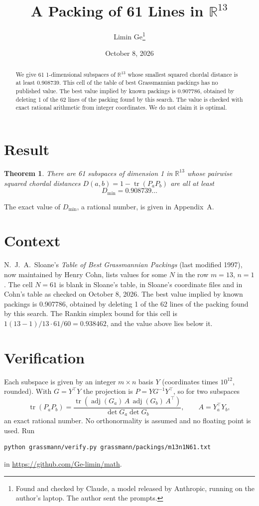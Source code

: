 \documentclass[11pt,a4paper]{article}
\title{A Packing of 61 Lines in $\mathbb{R}^{13}$}
\author{Limin Ge\thanks{Found and checked by Claude, a model released by Anthropic, running on the author's laptop. The author sent the prompts.}}
\date{October 8, 2026}
\newtheorem*{theorem}{Theorem}
\begin{document}
\maketitle
\begin{abstract}
We give 61 1-dimensional subspaces of $\mathbb{R}^{13}$ whose smallest squared chordal distance is at least 0.908739. This cell of the table of best Grassmannian packings has no published value. The best value implied by known packings is 0.907786, obtained by deleting 1 of the 62 lines of the packing found by this search. The value is checked with exact rational arithmetic from integer coordinates. We do not claim it is optimal.
\end{abstract}

\section{Result}
\begin{theorem}
There are 61 subspaces of dimension 1 in $\mathbb{R}^{13}$ whose pairwise squared chordal distances $D(a,b) = 1 - \operatorname{tr}(P_aP_b)$ are all at least
\[ D_{\min} = 0.908739\ldots \]
\end{theorem}
The exact value of $D_{\min}$, a rational number, is given in Appendix~A.


\section{Context}
N.~J.~A.~Sloane's \emph{Table of Best Grassmannian Packings} (last modified 1997), now maintained by Henry Cohn, lists values for some $N$ in the row $m=13$, $n=1$. The cell $N=61$ is blank in Sloane's table, in Sloane's coordinate files and in Cohn's table as checked on October 8, 2026. The best value implied by known packings is 0.907786, obtained by deleting 1 of the 62 lines of the packing found by this search. The Rankin simplex bound for this cell is $1(13-1)/13\cdot 61/60 = 0.938462$, and the value above lies below it.


\section{Verification}
Each subspace is given by an integer $m\times n$ basis $Y$ (coordinates times $10^{12}$, rounded). With $G=Y^\top Y$ the projection is $P=YG^{-1}Y^\top$, so for two subspaces
\[ \operatorname{tr}(P_aP_b)=\frac{\operatorname{tr}(\operatorname{adj}(G_a)\,A\,\operatorname{adj}(G_b)\,A^\top)}{\det G_a\det G_b},\qquad A=Y_a^\top Y_b, \]
an exact rational number. No orthonormality is assumed and no floating point is used. Run
\begin{verbatim}
python grassmann/verify.py grassmann/packings/m13n1N61.txt
\end{verbatim}
in \url{https://github.com/Ge-limin/math}.
\end{document}
